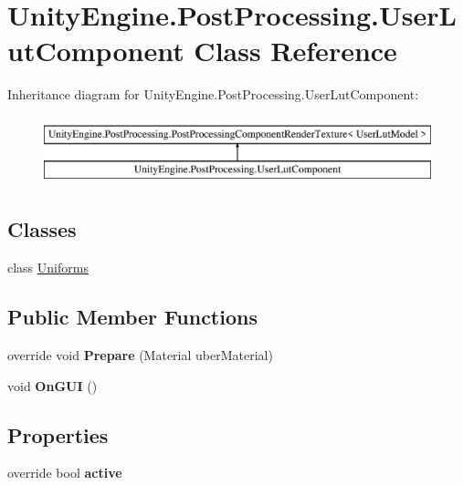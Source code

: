 \hypertarget{class_unity_engine_1_1_post_processing_1_1_user_lut_component}{}\section{Unity\+Engine.\+Post\+Processing.\+User\+Lut\+Component Class Reference}
\label{class_unity_engine_1_1_post_processing_1_1_user_lut_component}
Inheritance diagram for Unity\+Engine.\+Post\+Processing.\+User\+Lut\+Component\+:\begin{figure}[H]
\begin{center}
\leavevmode
\includegraphics[height=2.000000cm]{class_unity_engine_1_1_post_processing_1_1_user_lut_component}
\end{center}
\end{figure}
\subsection*{Classes}
\begin{DoxyCompactItemize}
\item 
class \hyperlink{class_unity_engine_1_1_post_processing_1_1_user_lut_component_1_1_uniforms}{Uniforms}
\end{DoxyCompactItemize}
\subsection*{Public Member Functions}
\begin{DoxyCompactItemize}
\item 
\mbox{\label{class_unity_engine_1_1_post_processing_1_1_user_lut_component_a1d6e06b6268b29af5a7903889feeff4b}} 
override void {\bfseries Prepare} (Material uber\+Material)
\item 
\mbox{\label{class_unity_engine_1_1_post_processing_1_1_user_lut_component_ab7f0a943efb49620ee830296108b0b9c}} 
void {\bfseries On\+G\+UI} ()
\end{DoxyCompactItemize}
\subsection*{Properties}
\begin{DoxyCompactItemize}
\item 
\mbox{\label{class_unity_engine_1_1_post_processing_1_1_user_lut_component_a44cd6587c8dd47f373ec18f8e56edcd8}} 
override bool {\bfseries active}
\end{DoxyCompactItemize}



